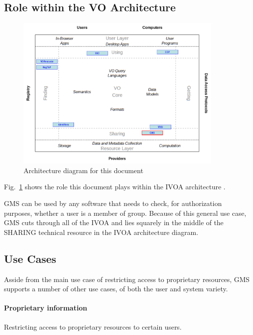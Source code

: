 \documentclass[11pt,a4paper]{ivoa}
\begin{document}
\subsection{Role within the VO Architecture}

\begin{figure}
\centering


\includegraphics[width=0.9\textwidth]{role_diagram.pdf}
\caption{Architecture diagram for this document}
\label{fig:archdiag}
\end{figure}

Fig.~\ref{fig:archdiag} shows the role this document plays within the
IVOA architecture \citep{note:VOARCH}.

GMS can be used by any software that needs to check, for authorization purposes, whether a user is a member of group.  Because of this general use case, GMS cuts through all of the IVOA and lies squarely in the middle of the SHARING technical resource in the IVOA architecture diagram.

\subsection{Use Cases}

Asside from the main use case of restricting access to proprietary resources, GMS supports a number of other use cases, of both the user and system variety.

\paragraph{Proprietary information} Restricting access to proprietary resources to certain users.
\end{document}

